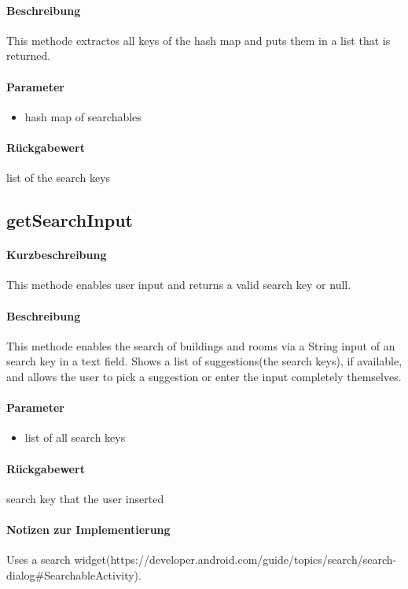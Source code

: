 \paragraph*{Beschreibung}
This methode extractes all keys of the hash map and puts them in a list that is returned.
\paragraph*{Parameter}
\begin{itemize}
    \item hash map of searchables
\end{itemize}
\paragraph*{Rückgabewert}
list of the search keys

\subsection{getSearchInput}%
\paragraph*{Kurzbeschreibung}
This methode enables user input and returns a valid search key or null.
\paragraph*{Beschreibung}
This methode enables the search of buildings and rooms via a String input of an search key in a text field.
Shows a list of suggestions(the search keys), if available, and allows the user to pick a suggestion or enter the input completely themselves.
\paragraph*{Parameter}
\begin{itemize}
    \item list of all search keys
\end{itemize}
\paragraph*{Rückgabewert}
search key that the user inserted
\paragraph*{Notizen zur Implementierung}
Uses a search widget(https://developer.android.com/guide/topics/search/search-dialog#SearchableActivity).